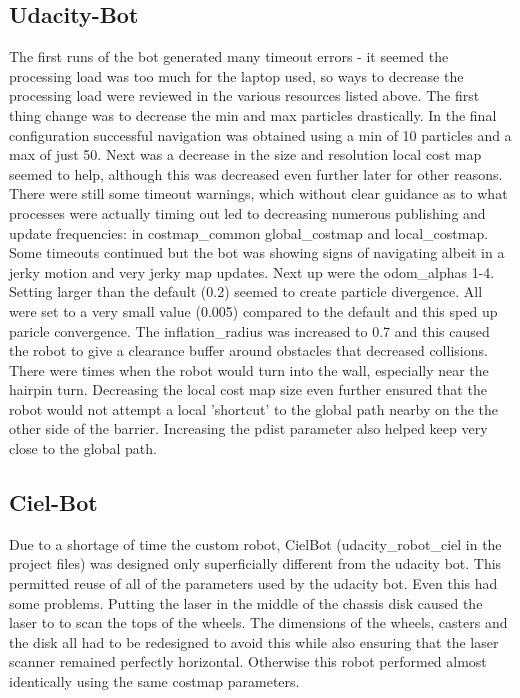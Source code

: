 \documentclass[10pt,journal,compsoc]{IEEEtran}
\begin{document}
\subsection{Udacity-Bot}
The first runs of the bot generated many timeout errors - it seemed the processing load was too much for the laptop used, so ways to decrease the processing load were reviewed in the various resources listed above. The first thing change was to decrease the min and max particles drastically. In the final configuration successful navigation was obtained using a min of 10 particles and a max of just 50. Next was a decrease in the size and resolution local cost map seemed to help, although this was decreased even further later for other reasons. 
There were still some timeout warnings, which without clear guidance as to what processes were actually timing out led to decreasing numerous publishing and update frequencies: in costmap\_common global\_costmap and local\_costmap. Some timeouts continued but the bot was showing signs of navigating albeit in a jerky motion and very jerky map updates. Next up were the odom\_alphas 1-4. Setting larger than the default (0.2) seemed to create particle divergence. All were set to a very small value (0.005) compared to the default and this sped up paricle convergence. The inflation\_radius was increased to 0.7 and this caused the robot to give a clearance buffer around obstacles that decreased collisions. There were times when the robot would turn into the wall, especially near the hairpin turn. Decreasing the local cost map size even further ensured that the robot would not attempt a local 'shortcut' to the global path nearby on the the other side of the barrier. Increasing the pdist parameter also helped keep very close to the global path.

\subsection{Ciel-Bot}
Due to a shortage of time the custom robot, CielBot (udacity\_robot\_ciel in the project files) was designed only superficially different from the udacity bot. This permitted reuse of all of the parameters used by the udacity bot. Even this had some problems. Putting the laser in the middle of the chassis disk caused the laser to to scan the tops of the wheels. The dimensions of the wheels, casters and the disk all had to be redesigned to avoid this while also ensuring that the laser scanner remained perfectly horizontal. Otherwise this robot performed almost identically using the same costmap parameters.
\end{document}
